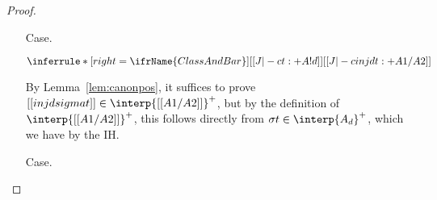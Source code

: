 \begin{proof}
\begin{itemize}
It suffices to assume arbitrary $y\in\textit{Vars}$ and
$t'\in\interp{[[A1 /\- A2]]}^{+c}$, and show $[[nu y . t' * (sigma t1
, sigma t2)]]\in\SN$.  If $t'\in\textit{Vars}$, then this follows by
Lemma~\ref{lem:sninterp} from the facts that $\sigma
t_1\in\interp{A_1}^+$ and $\sigma t_2\in\interp{A2}^+$, which we have
by the IH.  So suppose $t'$ is of the form $[[inj d t'']]$ for some
$d$ and some $t''\in\interp{A_d}^+$.  By the definition of $\SN$, it
suffices to show that all one-step successors $t_a$ of the term in
question are $\SN$.  The proof of this is by inner induction on
$\delta(t'') + \delta(\sigma t_1) + \delta(\sigma t_2)$, which exists
by Lemma~\ref{lem:sninterp}, using also Lemma~\ref{lem:stepinterp}.
Suppose that we step to $t_a$ by stepping $t''$, $\sigma t_1$, or
$\sigma t_2$.  Then the result holds by the inner IH.  So consider the
step
\[
[[nu y . inj d t'' * (sigma t1, sigma t2) ~> nu y . t'' * sigma h(t ! d)]]
\]
We then have $[[nu y . t'' * sigma h(t ! d)]]\in\SN$ from the facts
that $t''\in\interp{A_d}^+$ and $\sigma t_d\in\interp{A_d}^-$, by
the definition of $\interp{A_d}^+$.

\item[Case.]\ 

\vspace{-.2cm}
\begin{center}
\begin{math}
\inferrule* [right=\ifrName{ClassAndBar}] {[[J |-c t : + A ! d]]}{[[J |-c inj d t : + A1 /\- A2]]}
\end{math}
\end{center}
By Lemma~\ref{lem:canonpos}, it suffices to prove $[[inj d sigma
t]]\in\interp{[[ A1 /\- A2]]}^+$, but by the definition of $\interp{[[
  A1 /\- A2]]}^+$, this follows directly from $\sigma
t\in\interp{A_d}^+$, which we have by the IH.

\item[Case.]\ 


\end{itemize}
\end{proof}
